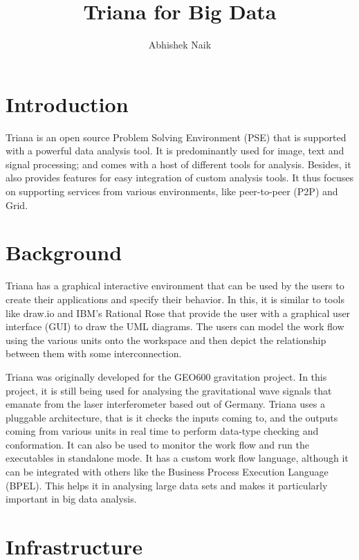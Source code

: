\documentclass[9pt,twocolumn,twoside]{styles/osajnl}
\title{Triana for Big Data}
\author{Abhishek Naik}
\affil[1]{School of Informatics and Computing, Bloomington, IN 47408, U.S.A.}
\affil[*]{Corresponding authors: ahnaik@indiana.edu}
\begin{document}
\maketitle

\section{Introduction}

Triana is an open source Problem Solving Environment (PSE) that is
supported with a powerful data analysis tool.  It is predominantly
used for image, text and signal processing; and comes with a host of
different tools for analysis.  Besides, it also provides features for
easy integration of custom analysis tools.  It thus focuses on
supporting services from various environments, like peer-to-peer (P2P)
and Grid.

\section{Background}
\cite{TrianaDocumentation1} Triana has a graphical interactive
environment that can be used by the users to create their applications
and specify their behavior.  In this, it is similar to tools like
\cite{DrawIO} draw.io and \cite{IBM-Rational-Rose} IBM's Rational Rose
that provide the user with a graphical user interface (GUI) to draw
the UML diagrams.  The users can model the work flow using the various
units onto the workspace and then depict the relationship between them
with some interconnection.

\cite{TrianaGEO600} Triana was originally developed for the GEO600
gravitation project.  In this project, it is still being used for
analysing the gravitational wave signals that emanate from the laser
interferometer based out of Germany.  \cite{TrianaDocumentation2}
Triana uses a pluggable architecture, that is it checks the inputs
coming to, and the outputs coming from various units in real time to
perform data-type checking and conformation.  It can also be used to
monitor the work flow and run the executables in standalone mode.
\cite{RMBDP-Book} It has a custom work flow language, although it can
be integrated with others like the Business Process Execution Language
(BPEL).  This helps it in analysing large data sets and makes it
particularly important in big data analysis.

\section{Infrastructure}
\end{document}
